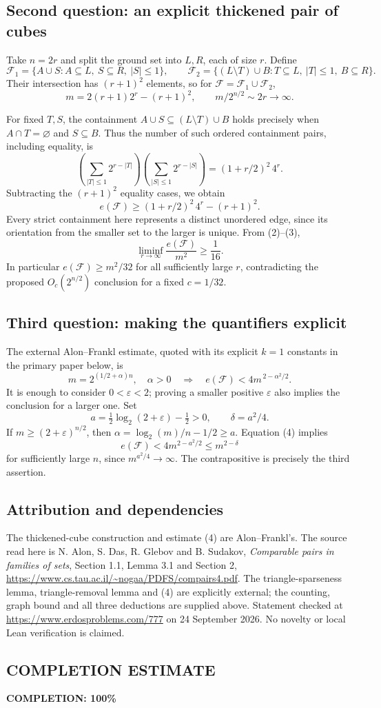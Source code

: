 \subsection*{Second question: an explicit thickened pair of cubes}
Take \(n=2r\) and split the ground set into \(L,R\), each of size \(r\). Define
\[
\mathcal F_1=\{A\cup S:A\subseteq L,\ S\subseteq R,\ |S|\leq1\},\qquad
\mathcal F_2=\{(L\setminus T)\cup B:T\subseteq L,\ |T|\leq1,\ B\subseteq R\}.
\]
Their intersection has \((r+1)^2\) elements, so for \(\mathcal F=\mathcal F_1\cup\mathcal F_2\),
\[
m=2(r+1)2^r-(r+1)^2,\qquad m/2^{n/2}\sim2r\longrightarrow\infty. \tag{2}
\]

For fixed \(T,S\), the containment \(A\cup S\subseteq(L\setminus T)\cup B\) holds precisely when \(A\cap T=\varnothing\) and \(S\subseteq B\). Thus the number of such ordered containment pairs, including equality, is
\[
\left(\sum_{|T|\leq1}2^{r-|T|}\right)
\left(\sum_{|S|\leq1}2^{r-|S|}\right)
=(1+r/2)^2\,4^r.
\]
Subtracting the \((r+1)^2\) equality cases, we obtain
\[
e(\mathcal F)\geq(1+r/2)^2\,4^r-(r+1)^2. \tag{3}
\]
Every strict containment here represents a distinct unordered edge, since its orientation from the smaller set to the larger is unique. From (2)--(3),
\[
\liminf_{r\to\infty}\frac{e(\mathcal F)}{m^2}\geq\frac1{16}.
\]
In particular \(e(\mathcal F)\geq m^2/32\) for all sufficiently large \(r\), contradicting the proposed \(O_c(2^{n/2})\) conclusion for a fixed \(c=1/32\).

\subsection*{Third question: making the quantifiers explicit}
The external Alon--Frankl estimate, quoted with its explicit \(k=1\) constants in the primary paper below, is
\[
m=2^{(1/2+\alpha)n},\quad \alpha>0
\quad\Longrightarrow\quad
e(\mathcal F)<4m^{\,2-\alpha^2/2}. \tag{4}
\]
It is enough to consider \(0<\varepsilon<2\); proving a smaller positive \(\varepsilon\) also implies the conclusion for a larger one. Set
\[
a=\tfrac12\log_2(2+\varepsilon)-\tfrac12>0,\qquad \delta=a^2/4.
\]
If \(m\geq(2+\varepsilon)^{n/2}\), then
\(\alpha=\log_2(m)/n-1/2\geq a\). Equation (4) implies
\[
e(\mathcal F)<4m^{2-a^2/2}\leq m^{2-\delta}
\]
for sufficiently large \(n\), since \(m^{a^2/4}\to\infty\). The contrapositive is precisely the third assertion.

\subsection*{Attribution and dependencies}
The thickened-cube construction and estimate (4) are Alon--Frankl's. The source read here is N. Alon, S. Das, R. Glebov and B. Sudakov, \emph{Comparable pairs in families of sets}, Section 1.1, Lemma 3.1 and Section 2, \url{https://www.cs.tau.ac.il/~nogaa/PDFS/compairs4.pdf}. The triangle-sparseness lemma, triangle-removal lemma and (4) are explicitly external; the counting, graph bound and all three deductions are supplied above. Statement checked at \url{https://www.erdosproblems.com/777} on 24 September 2026. No novelty or local Lean verification is claimed.
\subsection*{COMPLETION ESTIMATE}
\textbf{COMPLETION: 100\%}
